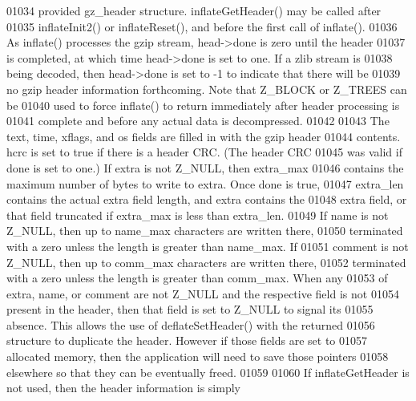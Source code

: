 \begin{DoxyCode}
01034 \textcolor{comment}{   provided gz\_header structure.  inflateGetHeader() may be called after}
01035 \textcolor{comment}{   inflateInit2() or inflateReset(), and before the first call of inflate().}
01036 \textcolor{comment}{   As inflate() processes the gzip stream, head->done is zero until the header}
01037 \textcolor{comment}{   is completed, at which time head->done is set to one.  If a zlib stream is}
01038 \textcolor{comment}{   being decoded, then head->done is set to -1 to indicate that there will be}
01039 \textcolor{comment}{   no gzip header information forthcoming.  Note that Z\_BLOCK or Z\_TREES can be}
01040 \textcolor{comment}{   used to force inflate() to return immediately after header processing is}
01041 \textcolor{comment}{   complete and before any actual data is decompressed.}
01042 \textcolor{comment}{}
01043 \textcolor{comment}{     The text, time, xflags, and os fields are filled in with the gzip header}
01044 \textcolor{comment}{   contents.  hcrc is set to true if there is a header CRC.  (The header CRC}
01045 \textcolor{comment}{   was valid if done is set to one.) If extra is not Z\_NULL, then extra\_max}
01046 \textcolor{comment}{   contains the maximum number of bytes to write to extra.  Once done is true,}
01047 \textcolor{comment}{   extra\_len contains the actual extra field length, and extra contains the}
01048 \textcolor{comment}{   extra field, or that field truncated if extra\_max is less than extra\_len.}
01049 \textcolor{comment}{   If name is not Z\_NULL, then up to name\_max characters are written there,}
01050 \textcolor{comment}{   terminated with a zero unless the length is greater than name\_max.  If}
01051 \textcolor{comment}{   comment is not Z\_NULL, then up to comm\_max characters are written there,}
01052 \textcolor{comment}{   terminated with a zero unless the length is greater than comm\_max.  When any}
01053 \textcolor{comment}{   of extra, name, or comment are not Z\_NULL and the respective field is not}
01054 \textcolor{comment}{   present in the header, then that field is set to Z\_NULL to signal its}
01055 \textcolor{comment}{   absence.  This allows the use of deflateSetHeader() with the returned}
01056 \textcolor{comment}{   structure to duplicate the header.  However if those fields are set to}
01057 \textcolor{comment}{   allocated memory, then the application will need to save those pointers}
01058 \textcolor{comment}{   elsewhere so that they can be eventually freed.}
01059 \textcolor{comment}{}
01060 \textcolor{comment}{     If inflateGetHeader is not used, then the header information is simply}

\end{DoxyCode}
